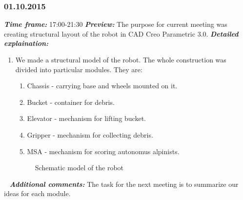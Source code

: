 \subsubsection{01.10.2015}
	\textit{\textbf{Time frame:}} 17:00-21:30 \newline
	\textit{\textbf{Preview:}} The purpose for current meeting was creating structural layout of the robot in CAD Creo Parametric 3.0.\newline \newline
  \textit{\textbf{Detailed explaination:}}
  \begin{enumerate}
  	\item We made a structural model of the robot. The whole construction was divided into particular modules. They are:
  	\begin{enumerate}
  		\item Chassis - carrying base and wheels mounted on it.
  		
  		\item Bucket - container for debris.
  		
  		\item Elevator - mechanism for lifting bucket.
  		
  		\item Gripper - mechanism for collecting debris.
  		
  		\item MSA - mechanism for scoring autonomus alpinists.
  	\end{enumerate}
  	\begin{figure}[H]
  		\begin{minipage}[h]{1\linewidth}
  			\caption{Schematic model of the robot}
  		\end{minipage}
  	\end{figure}
  	
  \end{enumerate}
  
   \newline
  \textit{\textbf{Additional comments:}} The task for the next meeting is to summarize our ideas for each module.

\fillpage
